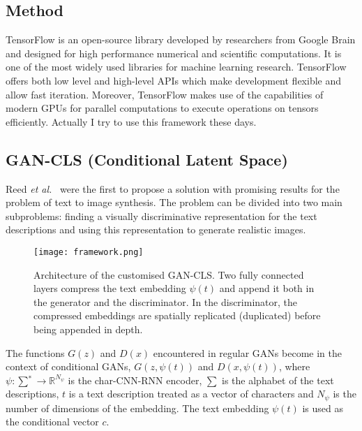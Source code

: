 \documentclass[10pt,twocolumn,letterpaper]{article}
\begin{document}
\subsection{Method}
TensorFlow is an open-source library developed by researchers from Google Brain and designed for high performance numerical and scientific computations. It is one of the most widely used libraries for machine learning research. TensorFlow offers both low level and high-level APIs which make development flexible and allow fast iteration. Moreover,
TensorFlow makes use of the capabilities of modern GPUs for parallel computations to execute operations on tensors efficiently. Actually I try to use this framework these days.
\subsection{GAN-CLS (Conditional Latent Space)}
Reed \emph{et al.}~\cite{name7} were the first to propose a solution with promising results for the problem of text to image synthesis. The problem can be divided into two main subproblems: finding a visually discriminative representation for the text descriptions and using this representation to generate realistic images.
  \begin{figure}[!htb]
  	\centering
  	\texttt{[image: framework.png]}\\
  	\caption{Architecture of the customised GAN-CLS. Two fully connected layers compress the text embedding $\psi(t)$ and append it both in the generator and the discriminator. In the discriminator, the compressed embeddings are spatially replicated (duplicated) before being appended in depth.}\label{Figure2} 
  \end{figure}
\par The functions $G(z)$ and $D(x)$ encountered in regular GANs become in the context of conditional GANs, $G(z, \psi(t))$ and $D(x, \psi(t))$, where $\psi : \sum^∗\to\mathbb{R}^{N_\psi}$ is the char-CNN-RNN
encoder, $\sum$ is the alphabet of the text descriptions, $t$ is a text description treated as a vector of characters and $N_\psi$ is the number of dimensions of the embedding. The text embedding $\psi(t)$ is used as the conditional vector $c$.
\end{document}
